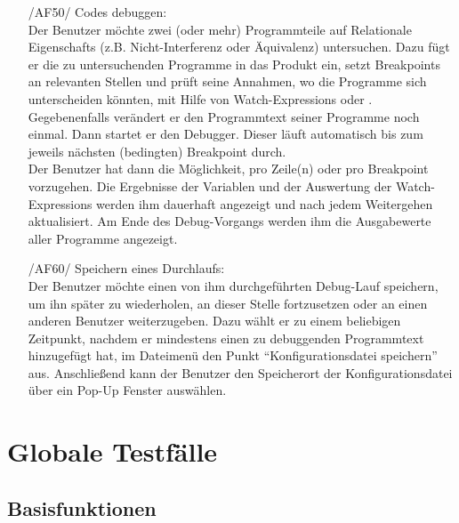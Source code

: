 \documentclass[parskip=full]{scrartcl}
\let\glsplgen\glsuseri
\begin{document}
\begin{itemize}
    \item [/AF50/] Codes debuggen: \\
        Der Benutzer möchte zwei (oder mehr) Programmteile auf \glspl{Relationale Eigenschaft} (z.B. Nicht-Interferenz oder Äquivalenz) untersuchen. Dazu fügt er die zu untersuchenden Programme in das Produkt ein, setzt Breakpoints an relevanten Stellen und prüft seine Annahmen, wo die Programme sich unterscheiden könnten, mit Hilfe von Watch-Expressions oder \glsplgen{bedingter Breakpoint}. Gegebenenfalls verändert er den Programmtext seiner Programme noch einmal. Dann startet er den \gls{Debugger}. Dieser läuft automatisch bis zum jeweils nächsten (bedingten) Breakpoint durch. \\Der Benutzer hat dann die Möglichkeit, pro Zeile(n) oder pro Breakpoint vorzugehen. Die Ergebnisse der Variablen und der Auswertung der Watch-Expressions werden ihm dauerhaft angezeigt und nach jedem Weitergehen aktualisiert. Am Ende des Debug-Vorgangs werden ihm die Ausgabewerte aller Programme angezeigt.
    
    \item [/AF60/] Speichern eines Durchlaufs: \\
    Der Benutzer möchte einen von ihm durchgeführten Debug-Lauf speichern, um ihn später zu wiederholen, an dieser Stelle fortzusetzen oder an einen anderen Benutzer weiterzugeben. Dazu wählt er zu einem beliebigen Zeitpunkt, nachdem er mindestens einen zu debuggenden Programmtext hinzugefügt hat, im Dateimenü den Punkt \enquote{\gls{Konfigurationsdatei} speichern} aus. Anschließend kann der Benutzer den Speicherort der Konfigurationsdatei über ein Pop-Up Fenster auswählen.\\

\end{itemize}
\section{Globale Testfälle}

\subsection{Basisfunktionen}
\end{document}

